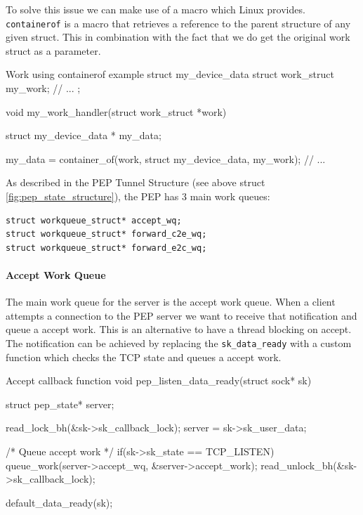 \documentclass[a4paper,english, 11pt]{report}
\begin{document}
To solve this issue we can make use of a macro which Linux provides. \verb|containerof| is a macro that retrieves a reference to the parent structure of any given struct. This in combination with the fact that we do get the original work struct as a parameter.\\

\begin{autonumlstlisting}[label=lst:work_containerof]{Work using containerof example}
struct my_device_data {
    struct work_struct my_work;
    // ...
};

void my_work_handler(struct work_struct *work)
{
   struct my_device_data * my_data;

   my_data = container_of(work, struct my_device_data,  my_work);
   // ...
}
\end{autonumlstlisting}

As described in the PEP Tunnel Structure (see above struct \ref{fig:pep_state_structure}), the PEP has 3 main work queues:
\begin{verbatim}
struct workqueue_struct* accept_wq;
struct workqueue_struct* forward_c2e_wq;
struct workqueue_struct* forward_e2c_wq;
\end{verbatim}

\paragraph{Accept Work Queue}
The main work queue for the server is the accept work queue. When a client attempts a connection to the PEP server we want to receive that notification and queue a accept work. This is an alternative to have a thread blocking on accept. The notification can be achieved by replacing the \verb|sk_data_ready| with a custom function which checks the TCP state and queues a accept work.\\

\begin{autonumlstlisting}[label=lst:pep_accept_callback]{Accept callback function}
void pep_listen_data_ready(struct sock* sk)
{
	struct pep_state* server;

	read_lock_bh(&sk->sk_callback_lock);
	server = sk->sk_user_data;

	/* Queue accept work */
	if(sk->sk_state == TCP_LISTEN){
		queue_work(server->accept_wq, &server->accept_work);
	}
	read_unlock_bh(&sk->sk_callback_lock);

	default_data_ready(sk);
}
\end{autonumlstlisting}
\end{document}
